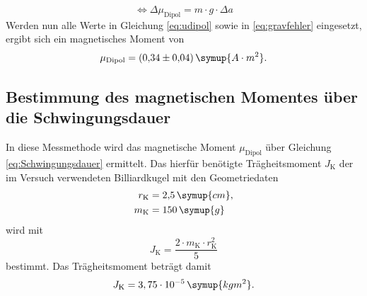 \begin{equation}
\iff \Delta{\mu_{\text{Dipol}}} = m \cdot g \cdot \Delta a
\label{eq:gravfehler}
\end{equation}
Werden nun alle Werte in Gleichung \eqref{eq:udipol} sowie in \eqref{eq:gravfehler} eingesetzt, ergibt sich ein magnetisches
Moment von
\begin{equation*}
\mu_{\text{Dipol}} = (0{,}34 \pm 0{,}04)\, \symup{A \cdot m^2}.
\end{equation*}




\subsection{Bestimmung des magnetischen Momentes über die Schwingungsdauer}
In diese Messmethode wird das magnetische Moment $\mu_{\text{Dipol}}$ über Gleichung \eqref{eq:Schwingungsdauer} ermittelt. 
Das hierfür benötigte Trägheitsmoment $J_{\text{K}}$ der im Versuch verwendeten Billiardkugel mit den Geometriedaten 
\begin{equation*}
\begin{aligned}
r_{\text{K}} &= 2{,}5\, \symup{cm}, \\
m_{\text{K}} &= 150\,\symup{g}
\end{aligned}
\end{equation*}
wird mit 
\begin{equation*}
J_{\text{K}} = \frac{2\cdot m_{\text{K}} \cdot r^2_{\text{K}}}{5}
\end{equation*}
bestimmt. Das Trägheitsmoment beträgt damit 
\begin{equation*}
J_{\text{K}} = 3,75 \cdot 10^{-5} \, \symup{kg m^2}.
\end{equation*}

\newpage

